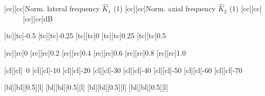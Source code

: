 [cc][cc]{\footnotesize Norm. lateral frequency $\hat{K}_{1}$ (1)}
[cc][cc]{\footnotesize Norm. axial frequency $\hat{K}_{2}$ (1)}
[cc][cc]{\footnotesize \textcolor{white}{$0.025$}}
[cc][cc]{\footnotesize \si{\deci\bel}}

[tc][tc]{\scriptsize -0.5}
[tc][tc]{\scriptsize -0.25}
[tc][tc]{\scriptsize 0}
[tc][tc]{\scriptsize 0.25}
[tc][tc]{\scriptsize 0.5}

[rc][rc]{\scriptsize 0}
[rc][rc]{\scriptsize 0.2}
[rc][rc]{\scriptsize 0.4}
[rc][rc]{\scriptsize 0.6}
[rc][rc]{\scriptsize 0.8}
[rc][rc]{\scriptsize 1.0}

[cl][cl]{\scriptsize ~0}
[cl][cl]{\scriptsize -10}
[cl][cl]{\scriptsize -20}
[cl][cl]{\scriptsize -30}
[cl][cl]{\scriptsize -40}
[cl][cl]{\scriptsize -50}
[cl][cl]{\scriptsize -60}
[cl][cl]{\scriptsize -70}


[bl][bl]{\subcaptionbox{\label{fig:sim_study_obj_B_adj_1_dft_qpw}}[0.5\columnwidth][l]{}}
[bl][bl]{\subcaptionbox{\label{fig:sim_study_obj_B_adj_1_dft_rnd_apo}}[0.5\columnwidth][l]{}}
[bl][bl]{\subcaptionbox{\label{fig:sim_study_obj_B_adj_1_dft_rnd_del}}[0.5\columnwidth][l]{}}
[bl][bl]{\subcaptionbox{\label{fig:sim_study_obj_B_adj_1_dft_rnd_apo_del}}[0.5\columnwidth][l]{}}

